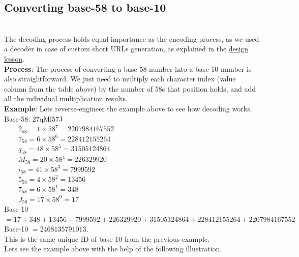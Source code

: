 \subsection{Converting base-58 to base-10}\label{hNlYbZGUwVwTjJdMbcvMP}
\\
The decoding process holds equal importance as the encoding process, as we used a decoder in case of custom short URLs generation, as explained in the \href{https://www.educative.io/courses/grokking-the-system-design-interview/design-and-deployment-of-tinyurl}{design lesson}.
\\
\textbf{Process}: The process of converting a base-58 number into a base-10 number is also straightforward. We just need to multiply each character index (value column from the table above) by the number of 58s that position holds, and add all the individual multiplication results.
\\
\textbf{Example}: Let\textquotesingle s reverse-engineer the example above to see how decoding works.
\\
Base-58: 27qMi57J
\\
  \protect{}\label{katex_inline_fQoUbSZDFEQeupR7ngisA}{{{\(2_{58} = 1 \times 58^{7} = 2207984167552\)}}}
\\
  \protect{}\label{katex_inline_I2sthMFD2ijIxg-Qd2SB8}{{{\(7_{58} = 6 \times 58^{6} = 228412155264\)}}}
\\
  \protect{}\label{katex_inline_Kyx_g6OyfsTSJiLZQf5IV}{{{\(q_{58} = 48 \times 58^{5} = 31505124864\)}}}
\\
  \protect{}\label{katex_inline_vnAwTXwHxacU1YgA51UJU}{{{\(M_{58} = 20 \times 58^{4} = 226329920\)}}}
\\
  \protect{}\label{katex_inline_fleTahVXRi5cpcVQCCjHS}{{{\(i_{58} = 41 \times 58^{3} = 7999592\)}}}
\\
  \protect{}\label{katex_inline_juxx1F1CuGBa3xsOm0QTl}{{{\(5_{58} = 4 \times 58^{2} = 13456\)}}}
\\
  \protect{}\label{katex_inline_N0CLgw-_c8vZX9LSNWUk-}{{{\(7_{58} = 6 \times 58^{1} = 348\)}}}
\\
  \protect{}\label{katex_inline_L_-q_iuk-X3ABfVO8PyOR}{{{\(J_{58} = 17 \times 58^{0} = 17\)}}}
\\
Base-10 \protect{}\label{katex_inline_aO8wm0F0cTU51El8vBrq5}{{{\(= 17 + 348 + 13456 + 7999592 + 226329920 + 31505124864 + 228412155264 + 2207984167552\)}}}
\\
Base-10 \protect{}\label{katex_inline_SFJO-cwhWtZsnsJarWO_X}{{{\(= 2468135791013\)}}}.
\\
This is the same unique ID of base-10 from the previous example.
\\
Let\textquotesingle s see the example above with the help of the following illustration.


